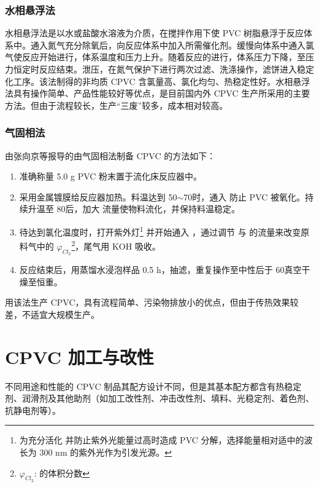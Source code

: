 \subsubsection{水相悬浮法}
水相悬浮法是以水或盐酸水溶液为介质，在搅拌作用下使 PVC 树脂悬浮于反应体系中。通入氮气充分除氧后，向反应体系中加入所需催化剂。缓慢向体系中通入氯气使反应开始进行，体系温度和压力上升。随着反应的进行，体系压力下降，至压力恒定时反应结束。泄压，在氮气保护下进行两次过滤、洗涤操作，滤饼进入稳定化工序\cite{23}。该法制得的非均质 CPVC 含氯量高、氯化均匀、热稳定性好。水相悬浮法具有操作简单、产品性能较好等优点，是目前国内外 CPVC 生产所采用的主要方法。但由于流程较长，生产“三废”较多，成本相对较高。

\subsubsection{气固相法}
由张向京等\cite{1}报导的由气固相法制备 CPVC 的方法如下：

\begin{enumerate}[(1) ]
    \item 准确称量 5.0 g PVC 粉末置于流化床反应器中。
    \item 采用金属镀膜给反应器加热。料温达到 50$\sim$70\cd 时，通入  防止 PVC 被氧化。持续升温至 80\cd 后，加大  流量使物料流化，并保持料温稳定。
    \item 待达到氯化温度时，打开紫外灯\footnote{为充分活化  并防止紫外光能量过高时造成 PVC 分解，选择能量相对适中的波长为 300 nm 的紫外光作为引发光源。} 并开始通入 ，通过调节  与  的流量来改变原料气中的 $\varphi_{Cl_2}$\footnote{$\varphi_{Cl_2}$:  的体积分数}，尾气用 KOH 吸收。
    \item 反应结束后，用蒸馏水浸泡样品 0.5 h，抽滤，重复操作至中性后于 60\cd 真空干燥至恒重。
\end{enumerate}

用该法生产 CPVC，具有流程简单、污染物排放小的优点，但由于传热效果较差，不适宜大规模生产。


\section{CPVC 加工与改性}
不同用途和性能的 CPVC 制品其配方设计不同，但是其基本配方都含有热稳定剂、润滑剂及其他助剂（如加工改性剂、冲击改性剂、填料、光稳定剂、着色剂、抗静电剂等）。

